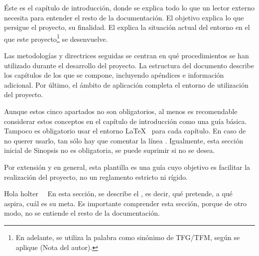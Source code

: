 
\minitoc

\begin{sinopsis}
\label{sec:intro:sinop}

Éste es el capítulo de introducción, donde se explica todo lo que un lector externo necesita para entender el resto de la documentación. El objetivo explica lo que persigue el proyecto, su finalidad.	El  explica la situación actual del entorno en el que este proyecto\footnote{En adelante, se utiliza la palabra  como sinónimo de TFG/TFM, según se aplique (Nota del autor).} se desenvuelve.

Las metodologías y directrices seguidas se centran en qué procedimientos se han utilizado durante el desarrollo del proyecto. La estructura del documento describe los capítulos de los que se compone, incluyendo apéndices e información adicional. Por último, el ámbito de aplicación completa el entorno de utilización del proyecto.

Aunque estos cinco apartados no son obligatorios, al menos es recomendable considerar estos conceptos en el capítulo de introducción como una guía básica. Tampoco es obligatorio usar el entorno \LaTeX\  para cada capítulo. En caso de no querer usarlo, tan sólo hay que comentar la línea . Igualmente, esta sección inicial de Sinopsis no es obligatoria, se puede suprimir si no se desea.

Por extensión y en general, esta plantilla es una guía cuyo objetivo es facilitar la realización del proyecto, no un reglamento estricto ni rígido.
\end{sinopsis}

\label{sec:intro:obj}

Hola holter~\cite{NormanHolter}~
En esta sección, se describe el , es decir, qué pretende, a qué aspira, cuál es su meta. Es importante comprender esta sección, porque de otro modo, no se entiende el resto de la documentación.

